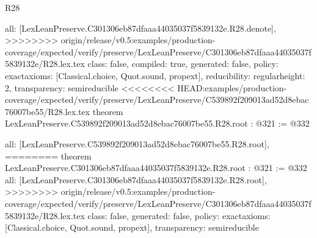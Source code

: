 \begin{lexlean}{R28}
\begin{coremodule}
{{{{{  all: [LexLeanPreserve.C301306eb87dfaaa44035037f5839132e.R28.denote],
>>>>>>>> origin/release/v0.5:examples/production-coverage/expected/verify/preserve/LexLeanPreserve/C301306eb87dfaaa44035037f5839132e/R28.lex.tex
  class: false,
  compiled: true,
  generated: false,
  policy: exact{axioms: [Classical.choice, Quot.sound, propext]},
  reducibility: regular{height: 2},
  transparency: semireducible
}
<<<<<<<< HEAD:examples/production-coverage/expected/verify/preserve/LexLeanPreserve/C539892f209013ad52d8ebac76007be55/R28.lex.tex
theorem LexLeanPreserve.C539892f209013ad52d8ebac76007be55.R28.root : @321 := @332 {
  all: [LexLeanPreserve.C539892f209013ad52d8ebac76007be55.R28.root],
========
theorem LexLeanPreserve.C301306eb87dfaaa44035037f5839132e.R28.root : @321 := @332 {
  all: [LexLeanPreserve.C301306eb87dfaaa44035037f5839132e.R28.root],
>>>>>>>> origin/release/v0.5:examples/production-coverage/expected/verify/preserve/LexLeanPreserve/C301306eb87dfaaa44035037f5839132e/R28.lex.tex
  class: false,
  generated: false,
  policy: exact{axioms: [Classical.choice, Quot.sound, propext]},
  transparency: semireducible
}

}}}}}
\end{coremodule}
\end{lexlean}
